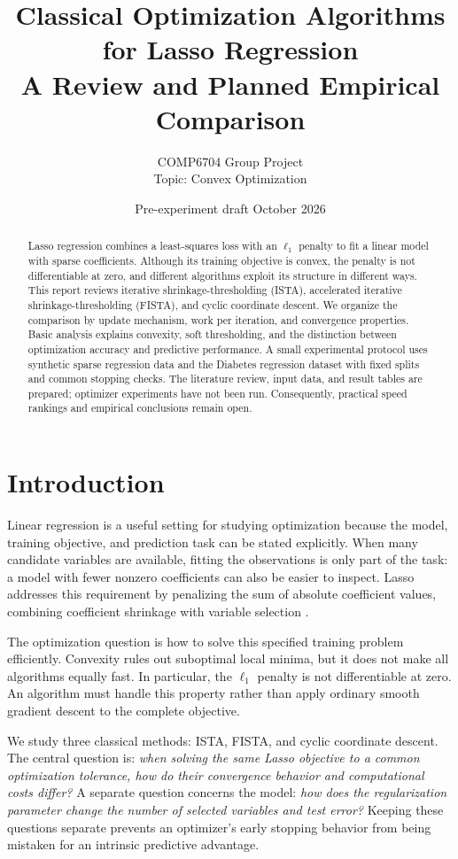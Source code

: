 \documentclass[11pt,a4paper]{article}
\title{\textbf{Classical Optimization Algorithms for Lasso Regression}\\
\large A Review and Planned Empirical Comparison}
\author{COMP6704 Group Project\\Topic: Convex Optimization}
\date{Pre-experiment draft \quad 5 October 2026}
\begin{document}
\maketitle
\begin{abstract}
Lasso regression combines a least-squares loss with an $\ell_1$ penalty to fit a linear model with sparse coefficients. Although its training objective is convex, the penalty is not differentiable at zero, and different algorithms exploit its structure in different ways. This report reviews iterative shrinkage-thresholding (ISTA), accelerated iterative shrinkage-thresholding (FISTA), and cyclic coordinate descent. We organize the comparison by update mechanism, work per iteration, and convergence properties. Basic analysis explains convexity, soft thresholding, and the distinction between optimization accuracy and predictive performance. A small experimental protocol uses synthetic sparse regression data and the Diabetes regression dataset with fixed splits and common stopping checks. The literature review, input data, and result tables are prepared; optimizer experiments have not been run. Consequently, practical speed rankings and empirical conclusions remain open.
\end{abstract}

\section{Introduction}
Linear regression is a useful setting for studying optimization because the model, training objective, and prediction task can be stated explicitly. When many candidate variables are available, fitting the observations is only part of the task: a model with fewer nonzero coefficients can also be easier to inspect. Lasso addresses this requirement by penalizing the sum of absolute coefficient values, combining coefficient shrinkage with variable selection \cite{tibshirani1996}.

The optimization question is how to solve this specified training problem efficiently. Convexity rules out suboptimal local minima, but it does not make all algorithms equally fast. In particular, the $\ell_1$ penalty is not differentiable at zero. An algorithm must handle this property rather than apply ordinary smooth gradient descent to the complete objective.

We study three classical methods: ISTA, FISTA, and cyclic coordinate descent. The central question is: \emph{when solving the same Lasso objective to a common optimization tolerance, how do their convergence behavior and computational costs differ?} A separate question concerns the model: \emph{how does the regularization parameter change the number of selected variables and test error?} Keeping these questions separate prevents an optimizer's early stopping behavior from being mistaken for an intrinsic predictive advantage.
\end{document}
